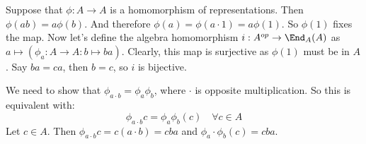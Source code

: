
Suppose that $\phi: A \to A$ is a homomorphism of representations. Then $\phi(ab)=a\phi(b)$.
And therefore $\phi(a)=\phi(a\cdot 1)=a\phi(1)$. So $\phi(1)$ fixes the map. Now let's define the algebra homomorphism $i : A^{op} \to \End_A(A) $ as $a \mapsto (\phi_a: A\to A: b \mapsto ba)$. Clearly, this map is surjective as $\phi(1)$ must be in $A$. Say $ba = ca$, then $b=c$, so $i$ is bijective.

We need to show that  $\phi_{a\cdot b}=\phi_a \phi_b$, where $\cdot$ is opposite multiplication. So this is equivalent with:
\[\phi_{a\cdot b}c = \phi_a \phi_b(c) \quad \forall c \in A \]
Let $c\in A$. Then $\phi_{a\cdot b}c = c(a\cdot b)=cba$ and $\phi_a \cdot \phi_b (c)= cba$.